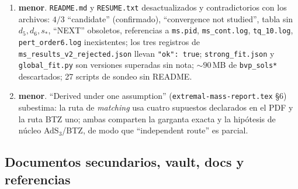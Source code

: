 \documentclass[10pt,a4paper]{article}
\newcommand{\MEN}{\textbf{menor}}
\newcommand{\code}[1]{\texttt{#1}}
\begin{document}
\begin{enumerate}[label=E\arabic*.,leftmargin=2.4em]
 \code{pert\_order5/6.json} se generaron con Python 3.10 en otra máquina y \code{pert\_order4.json}
 en Windows (el README dice 3.11).
\item \MEN. \code{README.md} y \code{RESUME.txt} desactualizados y contradictorios con los archivos:
 $4/3$ ``candidate'' (confirmado), ``convergence not studied'', tabla sin $d_5,d_6,s_*$, ``NEXT''
 obsoletos, referencias a \code{ms.pid}, \code{ms\_cont.log}, \code{tq\_10.log},
 \code{pert\_order6.log} inexistentes; los tres registros de \code{ms\_results\_v2\_rejected.json}
 llevan \code{"ok": true}; \code{strong\_fit.json} y \code{global\_fit.py} son versiones superadas
 sin nota; $\sim90$\,MB de \code{bvp\_sols*} descartados; 27 scripts de sondeo sin README.
\item \MEN. ``Derived under one assumption'' (\code{extremal-mass-report.tex} \S6) subestima: la
 ruta de \emph{matching} usa cuatro supuestos declarados en el PDF y la ruta BTZ uno; ambas comparten
 la garganta exacta y la hipótesis de núcleo AdS$_3$/BTZ, de modo que ``independent route'' es
 parcial.
\end{enumerate}

\subsection{Documentos secundarios, vault, docs y referencias}
\label{sec:docs}
\end{document}
